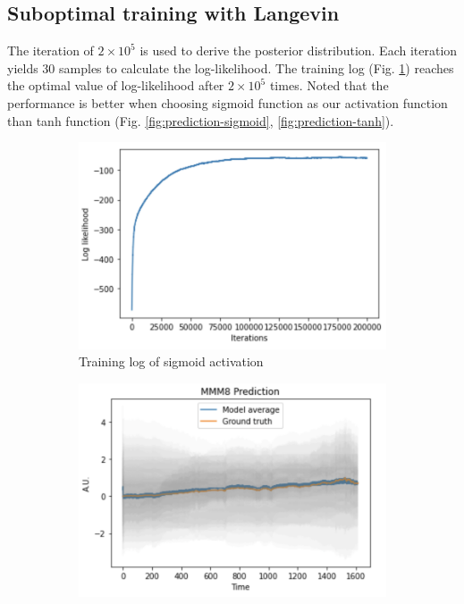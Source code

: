 \documentclass{article}
\begin{document}
\subsection{Suboptimal training with Langevin}

The iteration of $2\times 10^5$ is used to derive the posterior distribution. Each iteration yields $30$ samples to calculate the log-likelihood. The training log (Fig. \ref{fig:training-log-lagevin}) reaches the optimal value of log-likelihood after $2\times 10^5$ times. Noted that the performance is better when choosing sigmoid function as our activation function than tanh function (Fig. \ref{fig:prediction-sigmoid}, \ref{fig:prediction-tanh}).

\begin{figure}[h]
    \centering
    \begin{subfigure}[b]{0.5\textwidth}
        \centering
        \includegraphics[width=\textwidth]{../img/training_Langevin_200000_iter.png}
        \caption{Training log of sigmoid activation}
        \label{fig:training-log-lagevin}
    \end{subfigure}\hfill
    \begin{subfigure}[b]{0.5\textwidth}
        \centering
        \includegraphics[trim={0 0 0 0.7cm}, clip, width=\textwidth]{../img/prediction_Langevin_200000_iter.png}

\end{subfigure}
\end{figure}
\end{document}
